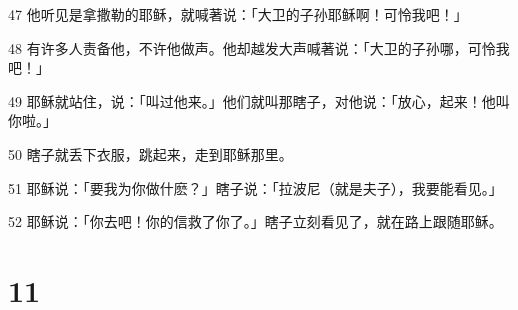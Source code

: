 \par 47 他听见是拿撒勒的耶稣，就喊著说：「大卫的子孙耶稣啊！可怜我吧！」
\par 48 有许多人责备他，不许他做声。他却越发大声喊著说：「大卫的子孙哪，可怜我吧！」
\par 49 耶稣就站住，说：「叫过他来。」他们就叫那瞎子，对他说：「放心，起来！他叫你啦。」
\par 50 瞎子就丢下衣服，跳起来，走到耶稣那里。
\par 51 耶稣说：「要我为你做什麽？」瞎子说：「拉波尼（就是夫子），我要能看见。」
\par 52 耶稣说：「你去吧！你的信救了你了。」瞎子立刻看见了，就在路上跟随耶稣。

\chapter{11}

